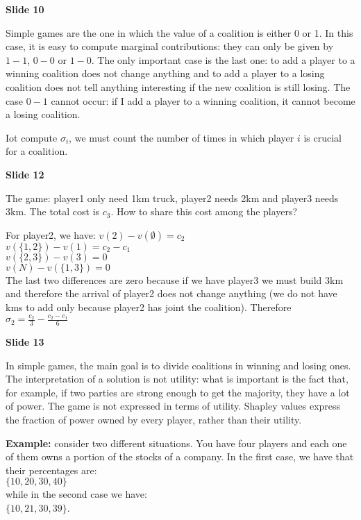 \documentclass[pt11,a4paper,twoside,reqno,openright]{paper}
\begin{document}
\bigskip
\noindent \textbf{Slide 10}

\noindent Simple games are the one in which the value of a coalition is either 
0 or 1. In this case, it is easy to compute marginal contributions: they can 
only be given by $1-1$, $0 - 0$ or $1 - 0$. The only important case is the 
last one: to add a player to a winning coalition does not change anything and 
to add a player to a losing coalition does not tell anything interesting if 
the new coalition is still losing. 
The case $0 - 1$ cannot occur: if I add a player to a winning coalition, it 
cannot become a losing coalition.

\noindent Iot compute $\sigma_i$, we must count the number of times in which 
player $i$ is crucial for a coalition.

\bigskip
\noindent \textbf{Slide 12}

\noindent The game: player1 only need 1km truck, player2 needs 2km and player3 
needs 3km. The total cost is $c_3$. How to share this cost among the players? 

\noindent For player2, we have:
$v(2) - v(\emptyset) = c_2$\\
$v(\{1,2\}) - v(1) = c_2 - c_1$\\
$v(\{2,3\}) - v(3) = 0$\\
$v(N) - v(\{1,3\}) = 0$\\
The last two differences are zero because if we have player3 we must build 
3km and therefore the arrival of player2 does not change anything (we do not 
have kms to add only because player2 has joint the coalition). 
Therefore $\sigma_2 = \frac{c_2}{3} - \frac{c_2-c_1}{6}$

\bigskip
\noindent \textbf{Slide 13}

\noindent In simple games, the main goal is to divide coalitions in winning 
and losing ones. The interpretation of a solution is not utility: what is 
important is the fact that, for example, if two parties are strong enough to 
get the majority, they have a lot of power. The game is not expressed in terms 
of utility. Shapley values express the fraction of power owned by every player, 
rather than their utility.

\noindent \textbf{Example:} consider two different situations. You have 
four players and each one of them owns a portion of the stocks of a 
company. In the first case, we have that their percentages are:\\
$\{10, 20, 30, 40\}$\\
while in the second case we have: \\
$\{10, 21, 30, 39\}$.
\end{document}
